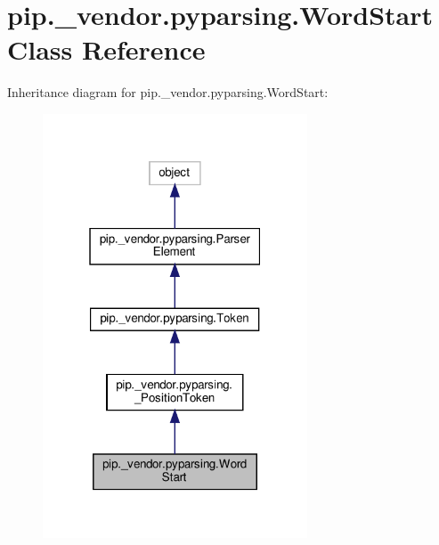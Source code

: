 \hypertarget{classpip_1_1__vendor_1_1pyparsing_1_1WordStart}{}\section{pip.\+\_\+vendor.\+pyparsing.\+Word\+Start Class Reference}
\label{classpip_1_1__vendor_1_1pyparsing_1_1WordStart}


Inheritance diagram for pip.\+\_\+vendor.\+pyparsing.\+Word\+Start\+:
\nopagebreak
\begin{figure}[H]
\begin{center}
\leavevmode
\includegraphics[width=223pt]{classpip_1_1__vendor_1_1pyparsing_1_1WordStart__inherit__graph}
\end{center}
\end{figure}


